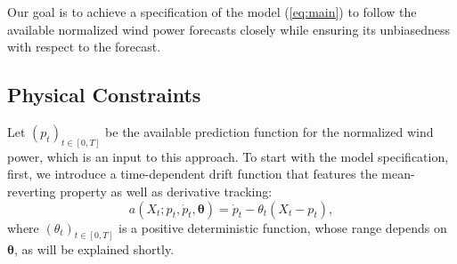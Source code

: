 \documentclass[11pt]{article}
\theoremstyle{definition}
\begin{document}
Our goal is to achieve a specification of the model (\ref{eq:main}) to follow the available normalized wind power forecasts closely while ensuring its unbiasedness with respect to the forecast.

\subsection{Physical Constraints} \label{Physical_Constraints}

Let $(p_t)_{t \in [0,T]}$ be the available prediction function for the normalized wind power, which is an input to this approach. To start with the model specification, first, we introduce a time-dependent drift function that features the mean-reverting property as well as derivative tracking:\begin{equation}
a(X_t; p_t, \dot{p}_t, \bm{\theta}) = \dot{p}_t  - \theta_t (X_t - p_t),  \label{drift:meanrev-derivtrack}
\end{equation} 
where $ (\theta_t)_{t \in [0,T]} $ is a positive deterministic function, whose range depends on $\bm{\theta}$, as will be explained shortly.
\end{document}
